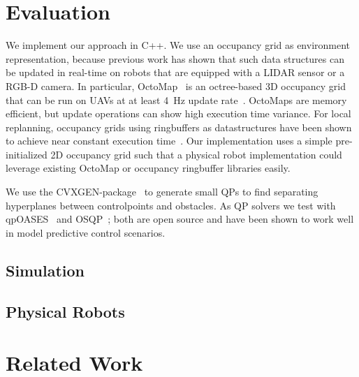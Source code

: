 \documentclass{svproc}
\begin{document}
\section{Evaluation}

We implement our approach in C++.
We use an occupancy grid as environment representation, because previous work has shown that such data structures can be updated in real-time on robots that are equipped with a LIDAR sensor or a RGB-D camera.
In particular, OctoMap~\cite{octomap} is an octree-based 3D occupancy grid that can be run on UAVs at at least \SI{4}{Hz} update rate~\cite{replanning-eth}.
OctoMaps are memory efficient, but update operations can show high execution time variance.
For local replanning, occupancy grids using ringbuffers as datastructures have been shown to achieve near constant execution time~\cite{replanning-usenko}.
Our implementation uses a simple pre-initialized 2D occupancy grid such that a physical robot implementation could leverage existing OctoMap or occupancy ringbuffer libraries easily.

We use the CVXGEN-package~\cite{cvxgen} to generate small QPs to find separating hyperplanes between controlpoints and obstacles.
As QP solvers we test with qpOASES~\cite{qpOASES} and OSQP~\cite{osqp}; both are open source and have been shown to work well in model predictive control scenarios. 


\subsection{Simulation}



\subsection{Physical Robots}


\section{Related Work}
\label{sec:relatedWork}
\end{document}
